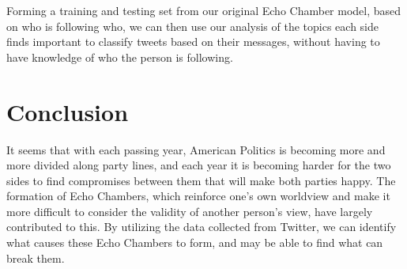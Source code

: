 \documentclass[journal]{IEEEtran}
\begin{document}
	Forming a training and testing set from our original Echo Chamber model, based on who is following who, we can then use our analysis of the topics each side finds important to classify tweets based on their messages, without having to have knowledge of who the person is following. 
	
	
	\section{Conclusion}
	
	It seems that with each passing year, American Politics is becoming more and more divided along party lines, and each year it is becoming harder for the two sides to find compromises between them that will make both parties happy. The formation of Echo Chambers, which reinforce one’s own worldview and make it more difficult to consider the validity of another person’s view, have largely contributed to this. By utilizing the data collected from Twitter, we can identify what causes these Echo Chambers to form, and may be able to find what can break them.
	
	
\end{document}
